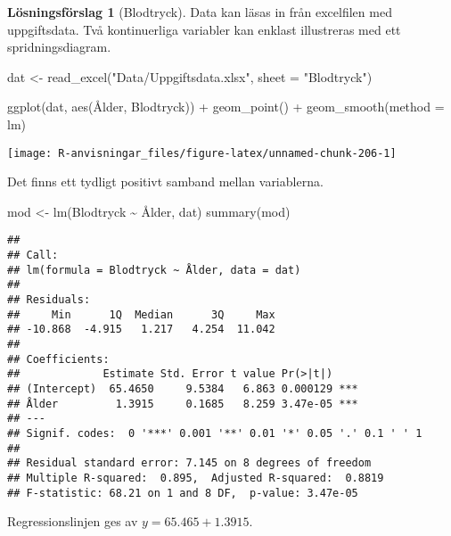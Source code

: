 \documentclass[
]{book}
\newenvironment{Shaded}{\begin{snugshade}}{\end{snugshade}}
\newcommand{\AttributeTok}[1]{\textcolor[rgb]{0.77,0.63,0.00}{#1}}
\newcommand{\FunctionTok}[1]{\textcolor[rgb]{0.00,0.00,0.00}{#1}}
\newcommand{\NormalTok}[1]{#1}
\newcommand{\OtherTok}[1]{\textcolor[rgb]{0.56,0.35,0.01}{#1}}
\newcommand{\SpecialCharTok}[1]{\textcolor[rgb]{0.00,0.00,0.00}{#1}}
\newcommand{\StringTok}[1]{\textcolor[rgb]{0.31,0.60,0.02}{#1}}
\theoremstyle{definition}
\theoremstyle{definition}
\theoremstyle{definition}
\theoremstyle{definition}
\newtheorem{hypothesis}{Lösningsförslag}[chapter]
\theoremstyle{remark}
\begin{document}
\begin{hypothesis}[Blodtryck]
Data kan läsas in från excelfilen med uppgiftsdata. Två kontinuerliga variabler kan enklast illustreras med ett spridningsdiagram.

\begin{Shaded}
\begin{Highlighting}[]
\NormalTok{dat }\OtherTok{\textless{}{-}} \FunctionTok{read\_excel}\NormalTok{(}\StringTok{"Data/Uppgiftsdata.xlsx"}\NormalTok{, }\AttributeTok{sheet =} \StringTok{"Blodtryck"}\NormalTok{)}

\FunctionTok{ggplot}\NormalTok{(dat, }\FunctionTok{aes}\NormalTok{(Ålder, Blodtryck)) }\SpecialCharTok{+}
  \FunctionTok{geom\_point}\NormalTok{() }\SpecialCharTok{+}
  \FunctionTok{geom\_smooth}\NormalTok{(}\AttributeTok{method =}\NormalTok{ lm)}
\end{Highlighting}
\end{Shaded}

\begin{center}\texttt{[image: R-anvisningar\_files/figure-latex/unnamed-chunk-206-1]} \end{center}

Det finns ett tydligt positivt samband mellan variablerna.

\begin{Shaded}
\begin{Highlighting}[]
\NormalTok{mod }\OtherTok{\textless{}{-}} \FunctionTok{lm}\NormalTok{(Blodtryck }\SpecialCharTok{\textasciitilde{}}\NormalTok{ Ålder, dat)}
\FunctionTok{summary}\NormalTok{(mod)}
\end{Highlighting}
\end{Shaded}

\begin{verbatim}
## 
## Call:
## lm(formula = Blodtryck ~ Ålder, data = dat)
## 
## Residuals:
##     Min      1Q  Median      3Q     Max 
## -10.868  -4.915   1.217   4.254  11.042 
## 
## Coefficients:
##             Estimate Std. Error t value Pr(>|t|)    
## (Intercept)  65.4650     9.5384   6.863 0.000129 ***
## Ålder         1.3915     0.1685   8.259 3.47e-05 ***
## ---
## Signif. codes:  0 '***' 0.001 '**' 0.01 '*' 0.05 '.' 0.1 ' ' 1
## 
## Residual standard error: 7.145 on 8 degrees of freedom
## Multiple R-squared:  0.895,  Adjusted R-squared:  0.8819 
## F-statistic: 68.21 on 1 and 8 DF,  p-value: 3.47e-05
\end{verbatim}

Regressionslinjen ges av \(y = 65.465 + 1.3915\).


\end{hypothesis}
\end{document}
